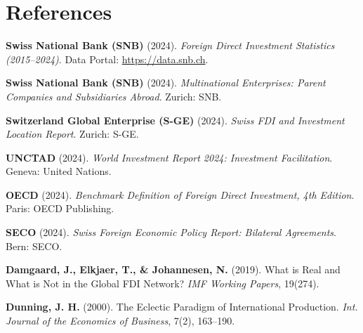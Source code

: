 \vspace{0.8em}
\section*{References}

\begin{enumerate}[leftmargin=1.8em, itemsep=2.5pt, label={[\arabic*]}]
    \small
    \item \textbf{Swiss National Bank (SNB)} (2024). \textit{Foreign Direct Investment Statistics (2015--2024)}. Data Portal: \url{https://data.snb.ch}.
    \item \textbf{Swiss National Bank (SNB)} (2024). \textit{Multinational Enterprises: Parent Companies and Subsidiaries Abroad}. Zurich: SNB.
    \item \textbf{Switzerland Global Enterprise (S-GE)} (2024). \textit{Swiss FDI and Investment Location Report}. Zurich: S-GE.
    \item \textbf{UNCTAD} (2024). \textit{World Investment Report 2024: Investment Facilitation}. Geneva: United Nations.
    \item \textbf{OECD} (2024). \textit{Benchmark Definition of Foreign Direct Investment, 4th Edition}. Paris: OECD Publishing.
    \item \textbf{SECO} (2024). \textit{Swiss Foreign Economic Policy Report: Bilateral Agreements}. Bern: SECO.
    \item \textbf{Damgaard, J., Elkjaer, T., \& Johannesen, N.} (2019). What is Real and What is Not in the Global FDI Network? \textit{IMF Working Papers}, 19(274).
    \item \textbf{Dunning, J. H.} (2000). The Eclectic Paradigm of International Production. \textit{Int. Journal of the Economics of Business}, 7(2), 163--190.
    \normalsize
\end{enumerate}
